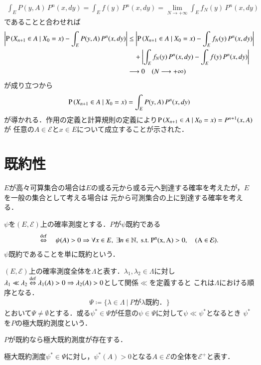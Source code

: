 \begin{prf}
\begin{align}
			\int_{E} P(y,A)\, P^n(x,dy) = \int_{E} f(y)\, P^n(x,dy) = \lim_{N \to +\infty} \int_{E} f_N(y)\, P^n(x,dy)
		\end{align}
		であることと合わせれば
		\begin{align}
			\left| \operatorname{P} \left( X_{n+1} \in A \ \middle|\ X_0 = x \right) - \int_{E} P(y,A)\, P^n(x,dy) \right| &\leq \left| \operatorname{P} \left( X_{n+1} \in A \ \middle|\ X_0 = x \right) - \int_{E} f_N(y)\, P^n(x,dy) \right| \\
			&\quad+ \left| \int_{E} f_N(y)\, P^n(x,dy) - \int_{E} f(y)\, P^n(x,dy) \right| \\
			&\longrightarrow 0 \quad (N \longrightarrow +\infty)
		\end{align}
		が成り立つから
		\begin{align}
			\operatorname{P} \left( X_{n+1} \in A \ \middle|\ X_0 = x \right) = \int_{E} P(y,A)\, P^n(x,dy)
		\end{align}
		が導かれる．作用の定義と計算規則の定義により$\operatorname{P} \left( X_{n+1} \in A \ \middle|\ X_0 = x \right) = P^{n+1}(x,A)$が
		任意の$A \in \mathcal{E}$と$x \in E$について成立することが示された．
		\QED
	\end{prf}

\section{既約性}
	$E$が高々可算集合の場合は$E$の或る元から或る元へ到達する確率を考えたが，$E$を一般の集合として考える場合は
	元から可測集合の上に到達する確率を考える．
	\begin{dfn}[既約性]
		$\psi$を$(E,\mathcal{E})$上の確率測度とする．$P$が$\psi$既約である
		\begin{align}
			\DEF \quad \psi(A) > 0 \Rightarrow \forall x \in E,\ \exists n \in \N,\ \rm{s.t.}\ P^n(x,A) > 0, \quad (A \in \mathcal{E}).
		\end{align}
		$\psi$既約であることを単に既約という．
	\end{dfn}
	
	\begin{dfn}[極大既約測度]
		$(E, \mathcal{E})$上の確率測度全体を$\Lambda$と表す．$\lambda_1, \lambda_2 \in \Lambda$に対し
		$\lambda_1 \ll \lambda_2 \overset{\mathrm{def}}{\Leftrightarrow} \lambda_1(A) > 0 \Rightarrow \lambda_2(A) > 0$として関係$\ll$を定義すると
		これは$\Lambda$における順序となる．
		\begin{align}
			\Psi \coloneqq \{ \lambda \in \Lambda\ |\ \mbox{$P$が$\lambda$既約．} \}
		\end{align}
		とおいて$\Psi \neq \emptyset$とする．或る$\psi^* \in \Psi$が任意の$\psi \in \Psi$に対して$\psi \ll \psi^*$となるとき
		$\psi^*$を$P$の極大既約測度という．
	\end{dfn}
	\begin{prp}[極大既約測度の存在]
		$P$が既約なら極大既約測度が存在する．
	\end{prp}
	極大既約測度$\psi^* \in \Psi$に対し，$\psi^*(A) > 0$となる$A \in \mathcal{E}$の全体を$\mathcal{E}^+$と表す．

